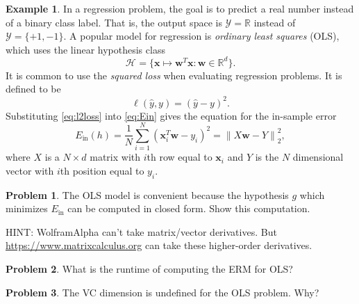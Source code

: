 \documentclass[10pt]{exam}
\theoremstyle{definition}
\newtheorem{problem}{Problem}
\newtheorem{example}{Example}
\newcommand{\R}{\mathbb R}
\DeclareMathOperator*{\argmin}{arg\,min}
\newcommand{\Ein}{E_{\text{in}}}
\newcommand{\trans}[1]{{#1}^{T}}
\newcommand{\w}{\mathbf w}
\newcommand{\x}{\mathbf x}
\newcommand{\ltwo}[1]{{\lVert {#1} \rVert}_2}
\newcommand{\HH}[1]{\mathcal H_{\text{#1}}}
\begin{document}
\begin{example}
    In a regression problem, the goal is to predict a real number instead of a binary class label.
    That is, the output space is $\mathcal Y=\R$ instead of $\mathcal Y = \{+1, -1\}$.
    A popular model for regression is \emph{ordinary least squares} (OLS), which uses the linear hypothesis class
    \begin{equation}
        \HH{} = \bigg\{ \x \mapsto \trans\w \x : \w \in \R^d \bigg\}.
    \end{equation}
    It is common to use the \emph{squared loss} when evaluating regression problems.
    It is defined to be
    \begin{equation}
        \label{eq:l2loss}
        \ell(\hat y, y) = (\hat y - y)^2
        .
    \end{equation}
    Substituting \eqref{eq:l2loss} into \eqref{eq:Ein} gives the equation for the in-sample error
    \begin{equation}
        \Ein(h) 
        = \frac{1}{N}\sum_{i=1}^N (\trans\x_i \w - y_i)^2
        = \ltwo{X\w - Y}^2,
    \end{equation}
    where $X$ is a $N \times d$ matrix with $i$th row equal to $\x_i$ and $Y$ is the $N$ dimensional vector with $i$th position equal to $y_i$.
\end{example}


\begin{problem}
    The OLS model is convenient because the hypothesis $g$ which minimizes $\Ein$ can be computed in closed form.
    Show this computation.

    HINT: WolframAlpha can't take matrix/vector derivatives.
    But \url{https://www.matrixcalculus.org} can take these higher-order derivatives.
\end{problem}

\newpage
\begin{problem}
    What is the runtime of computing the ERM for OLS?
\end{problem}

\vspace{4in}
\begin{problem}
    The VC dimension is undefined for the OLS problem.
    Why?
\end{problem}
\end{document}
